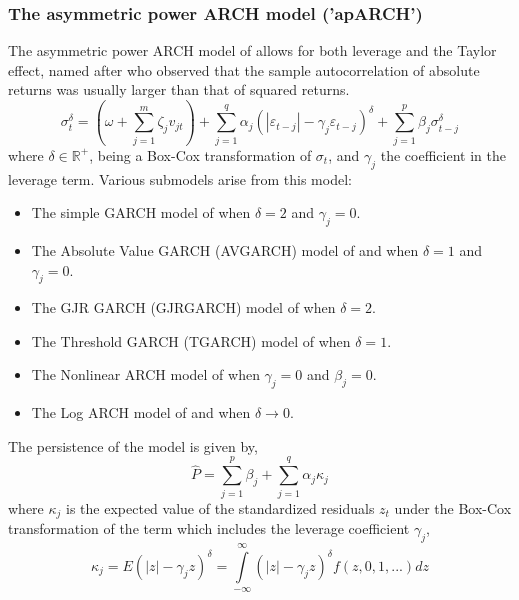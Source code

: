 \subsubsection{The asymmetric power ARCH model ('apARCH')}\label{section:aparch}
The asymmetric power ARCH model of \citet{Ding1} allows for both leverage and
the Taylor effect, named after \citet{Taylor} who observed that the sample
autocorrelation of absolute returns was usually larger than that of squared
returns.
\begin{equation}\label{eq:aparch}
\sigma _t^\delta  = \left( {\omega  + \sum\limits_{j = 1}^m {{\zeta _j}{v_{jt}}} } \right) + \sum\limits_{j = 1}^q {{\alpha _j}{{\left( {\left| {{\varepsilon _{t - j}}} \right| - {\gamma _j}{\varepsilon _{t - j}}} \right)}^\delta } + } \sum\limits_{j = 1}^p {{\beta _j}\sigma _{t - j}^\delta }
\end{equation}
where $\delta  \in {\mathbb{R}^ + }$, being a Box-Cox transformation of $\sigma_t$,
and $\gamma_j$ the coefficient in the leverage term. Various submodels arise
from this model:
\begin{itemize}
\item The simple GARCH model of \citet{Bollerslev1} when $\delta=2$ and $\gamma_j=0$.
\item The Absolute Value GARCH (AVGARCH) model of \citet{Taylor} and \citet{Schwert} when $\delta=1$ and $\gamma_j=0$.
\item The GJR GARCH (GJRGARCH) model of \citet{Glosten1} when $\delta=2$.
\item The Threshold GARCH (TGARCH) model of \citet{Zakoian} when $\delta=1$.
\item The Nonlinear ARCH model of \citet{Higgins} when $\gamma_j=0$ and $\beta_j=0$.
\item The Log ARCH model of \citet{Geweke} and \citet{Pantula} when $\delta  \to 0$.
\end{itemize}
The persistence of the model is given by,
\begin{equation}\label{eq:aparchp}
\hat P = \sum\limits_{j = 1}^p {{\beta_j} + } \sum\limits_{j = 1}^q {{\alpha_j}} {\kappa_j}
\end{equation}
where $\kappa_j$ is the expected value of the standardized residuals $z_t$ under
the Box-Cox transformation of the term which includes the leverage coefficient
$\gamma_j$,
\begin{equation}\label{eq:aparchkappa}
\kappa_j  = E{\left( {\left| z \right| - {\gamma _j}z} \right)^\delta } = \int\limits_{ - \infty }^\infty  {{{\left( {\left| z \right| - {\gamma _j}z} \right)}^\delta }f\left( {z,0,1,...} \right)dz}
\end{equation}
